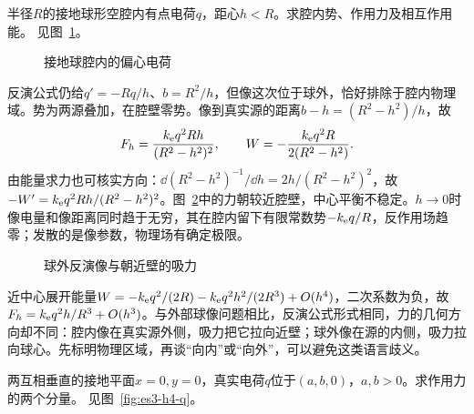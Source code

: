 \begin{exercise}[球内点电荷与接地腔壁]\label{ex:es3-h3}
半径$R$的接地球形空腔内有点电荷$q$，距心$h<R$。求腔内势、作用力及相互作用能。 见图~\ref{fig:es3-h3-q}。
\end{exercise}

\begin{figure}[H]\centering
{}
\caption{接地球腔内的偏心电荷}\label{fig:es3-h3-q}
\end{figure}
\begin{solution}
反演公式仍给$q'=-Rq/h$、$b=R^2/h$，但像这次位于球外，恰好排除于腔内物理域。势为两源叠加，在腔壁零势。像到真实源的距离$b-h=(R^2-h^2)/h$，故
\[F_h=\frac{k_{\rm e} q^2Rh}{(R^2-h^2)^2},\qquad W=-\frac{k_{\rm e} q^2R}{2(R^2-h^2)}.
\]
由能量求力也可核实方向：$\dd(R^2-h^2)^{-1}/\dd h=2h/(R^2-h^2)^2$，故$-W'=k_{\rm e} q^2Rh/(R^2-h^2)^2$。图~\ref{fig:es3-h3-s}中的力朝较近腔壁，中心平衡不稳定。$h\to0$时像电量和像距离同时趋于无穷，其在腔内留下有限常数势$-k_{\rm e} q/R$，反作用场趋零；发散的是像参数，物理场有确定极限。
\begin{figure}[H]\centering
{}
\caption{球外反演像与朝近壁的吸力}\label{fig:es3-h3-s}
\end{figure}


近中心展开能量$W=-k_{\rm e} q^2/(2R)-k_{\rm e} q^2h^2/(2R^3)+O(h^4)$，二次系数为负，故$F_h=k_{\rm e} q^2h/R^3+O(h^3)$。与外部球像问题相比，反演公式形式相同，力的几何方向却不同：腔内像在真实源外侧，吸力把它拉向近壁；球外像在源的内侧，吸力拉向球心。先标明物理区域，再谈“向内”或“向外”，可以避免这类语言歧义。
\end{solution}

\begin{exercise}[直角接地二面角]\label{ex:es3-h4}
两互相垂直的接地平面$x=0,y=0$，真实电荷$q$位于$(a,b,0)$，$a,b>0$。求作用力的两个分量。 见图~\ref{fig:es3-h4-q}。
\end{exercise}

